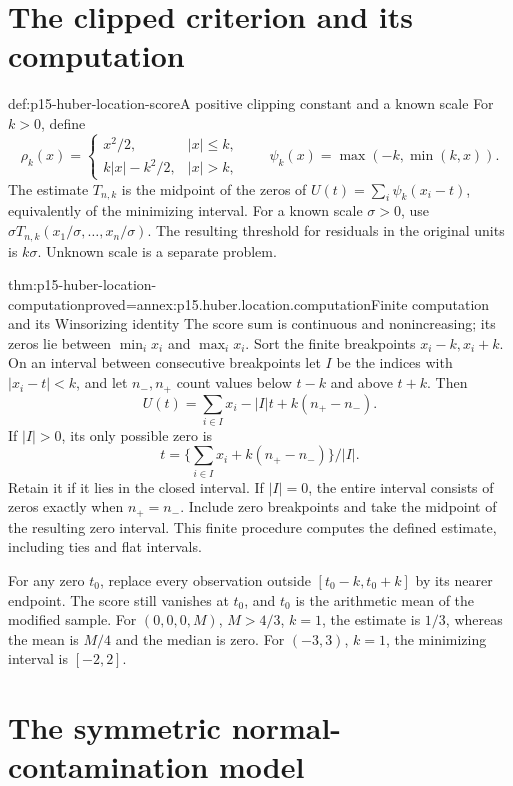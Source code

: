 \section{The clipped criterion and its computation}
\label{sec:p15-huber-location-computation}

\begin{hbdefinition}{def:p15-huber-location-score}{A positive clipping constant and a known scale}
For \(k>0\), define
\[
 \rho_k(x)=
 \begin{cases}x^2/2,&|x|\leq k,\\ k|x|-k^2/2,&|x|>k,\end{cases}
 \qquad
 \psi_k(x)=\max(-k,\min(k,x)).
\]
The estimate \(T_{n,k}\) is the midpoint of the zeros of
\(U(t)=\sum_i\psi_k(x_i-t)\), equivalently of the minimizing interval.
For a known scale \(\sigma>0\), use
\(\sigma T_{n,k}(x_1/\sigma,\ldots,x_n/\sigma)\).
The resulting threshold for residuals in the original units is \(k\sigma\).
Unknown scale is a separate problem.
\end{hbdefinition}

\begin{hbtheorem}{thm:p15-huber-location-computation}{proved=annex:p15.huber.location.computation}{Finite computation and its Winsorizing identity}
The score sum is continuous and nonincreasing; its zeros lie between
\(\min_i x_i\) and \(\max_i x_i\).
Sort the finite breakpoints \(x_i-k,x_i+k\).
On an interval between consecutive breakpoints let \(I\) be the
indices with \(|x_i-t|<k\), and let \(n_-,n_+\) count values below
\(t-k\) and above \(t+k\). Then
\[
 U(t)=\sum_{i\in I}x_i-|I|t+k(n_+-n_-).
\]
If \(|I|>0\), its only possible zero is
\[
 t=\{\sum_{i\in I}x_i+k(n_+-n_-)\}/|I|.
\]
Retain it if it lies in the closed interval.
If \(|I|=0\), the entire interval consists of zeros exactly when
\(n_+=n_-\). Include zero breakpoints and take the midpoint of the
resulting zero interval. This finite procedure computes the defined
estimate, including ties and flat intervals.

For any zero \(t_0\), replace every observation outside
\([t_0-k,t_0+k]\) by its nearer endpoint. The score still vanishes
at \(t_0\), and \(t_0\) is the arithmetic mean of the modified sample.
For \((0,0,0,M)\), \(M>4/3\), \(k=1\), the estimate is \(1/3\),
whereas the mean is \(M/4\) and the median is zero.
For \((-3,3)\), \(k=1\), the minimizing interval is \([-2,2]\).
\end{hbtheorem}

\section{The symmetric normal-contamination model}
\label{sec:p15-huber-normal-neighborhood}


